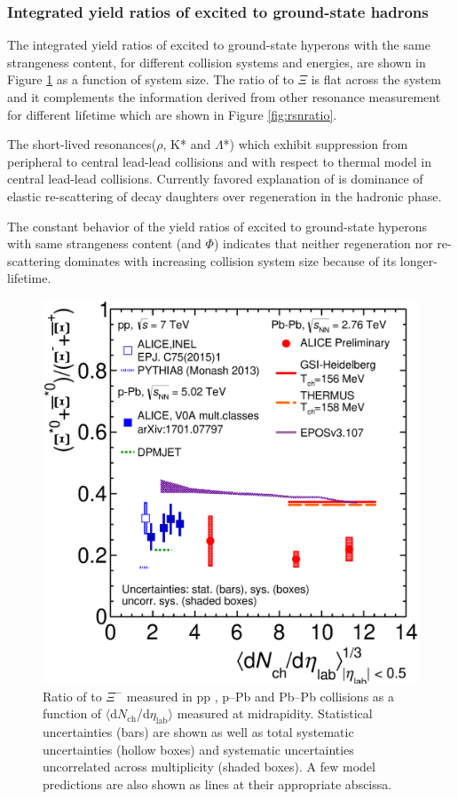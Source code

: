 \subsubsection{Integrated yield ratios of excited to ground-state hadrons}

The integrated yield ratios of excited to ground-state hyperons \cite{cite:pp7_multistrange, cite:lambda_pPb, cite:Xi_pp, cite:Xi_pPb} 
with the same strangeness content, for different collision systems and energies, are shown in Figure \ref{fig:xitoxi} as a function of system size. The ratio of \xis to $\Xi$ is flat across the system and it complements the information derived from other resonance measurement for different lifetime which are shown in Figure \ref{fig:rsnratio}.


The short-lived resonances($\rho$, K* and $\Lambda$*) which exhibit suppression from peripheral to central lead-lead collisions and with respect to thermal model in central lead-lead collisions. Currently favored explanation of  is dominance of elastic re-scattering of decay daughters over regeneration in the hadronic phase.

The constant behavior of the yield ratios of excited to ground-state hyperons with same strangeness content (\xis and $\Phi$) indicates that neither regeneration nor re-scattering dominates with increasing collision system size because of its longer-lifetime.

\begin{figure}[htbp]
\begin{center}
\includegraphics[width=10.cm]{./Version1/FigChapter6/Ratio/Ratio_XiStarToXi}
\caption{Ratio of \xis to $\Xi^-$ measured in pp \cite{cite:Xi_pp}, p--Pb \cite{cite:lambda_pPb, cite:Xi_pPb}  and Pb--Pb collisions as a function of $\langle$d$N_{\mathrm{ch}}$/d$\eta_{\mathrm{lab}}\rangle$ measured at midrapidity. Statistical uncertainties (bars) are shown as well as total systematic uncertainties (hollow boxes) and systematic uncertainties uncorrelated across multiplicity (shaded boxes). A few model predictions are also shown as lines at their appropriate abscissa.}
\label{fig:xitoxi}
\end{center}
\end{figure}

